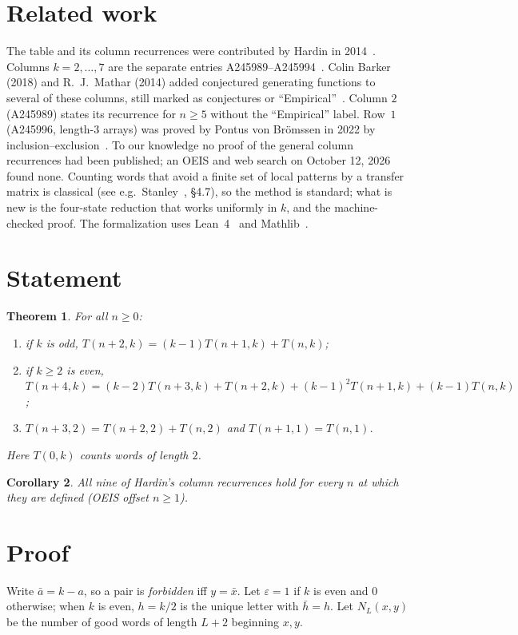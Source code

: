 \documentclass[11pt]{article}
\newtheorem{theorem}{Theorem}
\newtheorem{corollary}[theorem]{Corollary}
\theoremstyle{remark}\newtheorem{remark}[theorem]{Remark}
\begin{document}
\section{Related work}
The table and its column recurrences were contributed by Hardin in 2014~\cite{oeis}. Columns $k=2,\dots,7$ are the separate entries A245989--A245994~\cite{oeiscols}. Colin Barker (2018) and R.~J.~Mathar (2014) added conjectured generating functions to several of these columns, still marked as conjectures or ``Empirical''~\cite{oeiscols}. Column $2$ (A245989) states its recurrence for $n\ge5$ without the ``Empirical'' label. Row~$1$ (A245996, length-$3$ arrays) was proved by Pontus von Br\"omssen in 2022 by inclusion--exclusion~\cite{row1}. To our knowledge no proof of the general column recurrences had been published; an OEIS and web search on October 12, 2026 found none. Counting words that avoid a finite set of local patterns by a transfer matrix is classical (see e.g.\ Stanley~\cite{stanley}, \S4.7), so the method is standard; what is new is the four-state reduction that works uniformly in $k$, and the machine-checked proof. The formalization uses Lean~4~\cite{lean4} and Mathlib~\cite{mathlib}.

\section{Statement}
\begin{theorem}\label{thm:main}
For all $n\ge0$:
\begin{enumerate}
\item if $k$ is odd, $T(n+2,k)=(k-1)T(n+1,k)+T(n,k)$;
\item if $k\ge2$ is even, $T(n+4,k)=(k-2)T(n+3,k)+T(n+2,k)+(k-1)^2T(n+1,k)+(k-1)T(n,k)$;
\item $T(n+3,2)=T(n+2,2)+T(n,2)$ and $T(n+1,1)=T(n,1)$.
\end{enumerate}
Here $T(0,k)$ counts words of length $2$.
\end{theorem}
\begin{corollary}\label{cor:cols}
All nine of Hardin's column recurrences hold for every $n$ at which they are defined (OEIS offset $n\ge1$).
\end{corollary}

\section{Proof}
Write $\bar a=k-a$, so a pair is \emph{forbidden} iff $y=\bar x$. Let $\varepsilon=1$ if $k$ is even and $0$ otherwise; when $k$ is even, $h=k/2$ is the unique letter with $\bar h=h$. Let $N_L(x,y)$ be the number of good words of length $L+2$ beginning $x,y$.
\end{document}
